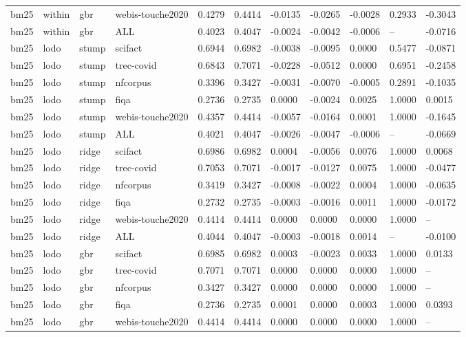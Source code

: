 \begin{table}[t]
\begin{tabular}{lllllllllll}
bm25 & within & gbr & webis-touche2020 & 0.4279 & 0.4414 & -0.0135 & -0.0265 & -0.0028 & 0.2933 & -0.3043 \\
bm25 & within & gbr & ALL & 0.4023 & 0.4047 & -0.0024 & -0.0042 & -0.0006 & -- & -0.0716 \\
bm25 & lodo & stump & scifact & 0.6944 & 0.6982 & -0.0038 & -0.0095 & 0.0000 & 0.5477 & -0.0871 \\
bm25 & lodo & stump & trec-covid & 0.6843 & 0.7071 & -0.0228 & -0.0512 & 0.0000 & 0.6951 & -0.2458 \\
bm25 & lodo & stump & nfcorpus & 0.3396 & 0.3427 & -0.0031 & -0.0070 & -0.0005 & 0.2891 & -0.1035 \\
bm25 & lodo & stump & fiqa & 0.2736 & 0.2735 & 0.0000 & -0.0024 & 0.0025 & 1.0000 & 0.0015 \\
bm25 & lodo & stump & webis-touche2020 & 0.4357 & 0.4414 & -0.0057 & -0.0164 & 0.0001 & 1.0000 & -0.1645 \\
bm25 & lodo & stump & ALL & 0.4021 & 0.4047 & -0.0026 & -0.0047 & -0.0006 & -- & -0.0669 \\
bm25 & lodo & ridge & scifact & 0.6986 & 0.6982 & 0.0004 & -0.0056 & 0.0076 & 1.0000 & 0.0068 \\
bm25 & lodo & ridge & trec-covid & 0.7053 & 0.7071 & -0.0017 & -0.0127 & 0.0075 & 1.0000 & -0.0477 \\
bm25 & lodo & ridge & nfcorpus & 0.3419 & 0.3427 & -0.0008 & -0.0022 & 0.0004 & 1.0000 & -0.0635 \\
bm25 & lodo & ridge & fiqa & 0.2732 & 0.2735 & -0.0003 & -0.0016 & 0.0011 & 1.0000 & -0.0172 \\
bm25 & lodo & ridge & webis-touche2020 & 0.4414 & 0.4414 & 0.0000 & 0.0000 & 0.0000 & 1.0000 & -- \\
bm25 & lodo & ridge & ALL & 0.4044 & 0.4047 & -0.0003 & -0.0018 & 0.0014 & -- & -0.0100 \\
bm25 & lodo & gbr & scifact & 0.6985 & 0.6982 & 0.0003 & -0.0023 & 0.0033 & 1.0000 & 0.0133 \\
bm25 & lodo & gbr & trec-covid & 0.7071 & 0.7071 & 0.0000 & 0.0000 & 0.0000 & 1.0000 & -- \\
bm25 & lodo & gbr & nfcorpus & 0.3427 & 0.3427 & 0.0000 & 0.0000 & 0.0000 & 1.0000 & -- \\
bm25 & lodo & gbr & fiqa & 0.2736 & 0.2735 & 0.0001 & 0.0000 & 0.0003 & 1.0000 & 0.0393 \\
bm25 & lodo & gbr & webis-touche2020 & 0.4414 & 0.4414 & 0.0000 & 0.0000 & 0.0000 & 1.0000 & -- \\

\end{tabular}
\end{table}
